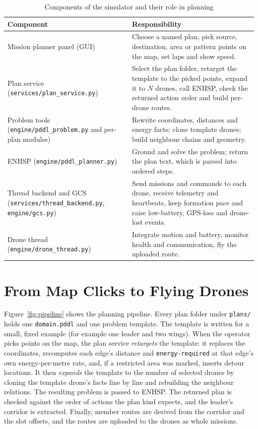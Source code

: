 \documentclass[11pt,a4paper,oneside]{report}
\newcommand{\code}[1]{\texttt{#1}}
\begin{document}
\begin{table}[H]
\caption{Components of the simulator and their role in planning}\label{tab:components}
\small
\begin{tabularx}{\textwidth}{@{}P{0.27\textwidth}Y@{}}
\toprule
\textbf{Component} & \textbf{Responsibility} \\
\midrule
Mission planner panel (GUI) & Choose a named plan, pick source, destination, area or pattern
points on the map, set laps and show speed. \\
Plan service (\code{services/plan\_service.py}) & Select the plan folder, retarget the template
to the picked points, expand it to $N$ drones, call ENHSP, check the returned action order and
build per-drone routes. \\
Problem tools (\code{engine/pddl\_problem.py} and per-plan modules) & Rewrite coordinates,
distances and energy facts; clone template drones; build neighbour chains and geometry. \\
ENHSP (\code{engine/pddl\_planner.py}) & Ground and solve the problem; return the plan text,
which is parsed into ordered steps. \\
Thread backend and GCS (\code{services/thread\_backend.py}, \code{engine/gcs.py}) & Send
missions and commands to each drone, receive telemetry and heartbeats, keep formation pace and
raise low-battery, GPS-loss and drone-lost events. \\
Drone thread (\code{engine/drone\_thread.py}) & Integrate motion and battery, monitor health
and communication, fly the uploaded route. \\
\bottomrule
\end{tabularx}
\end{table}

\section{From Map Clicks to Flying Drones}
Figure~\ref{fig:pipeline} shows the planning pipeline. Every plan folder under \code{plans/}
holds one \code{domain.pddl} and one problem template. The template is written for a small,
fixed example (for example one leader and two wings). When the operator picks points on the map,
the plan service \emph{retargets} the template: it replaces the coordinates, recomputes each
edge's distance and \code{energy-required} at that edge's own energy-per-metre rate, and, if a
restricted area was marked, inserts detour locations. It then \emph{expands} the template to the
number of selected drones by cloning the template drone's facts line by line and rebuilding the
neighbour relations. The resulting problem is passed to ENHSP. The returned plan is checked
against the order of actions the plan kind expects, and the leader's corridor is extracted.
Finally, member routes are derived from the corridor and the slot offsets, and the routes are
uploaded to the drones as whole missions.
\end{document}
